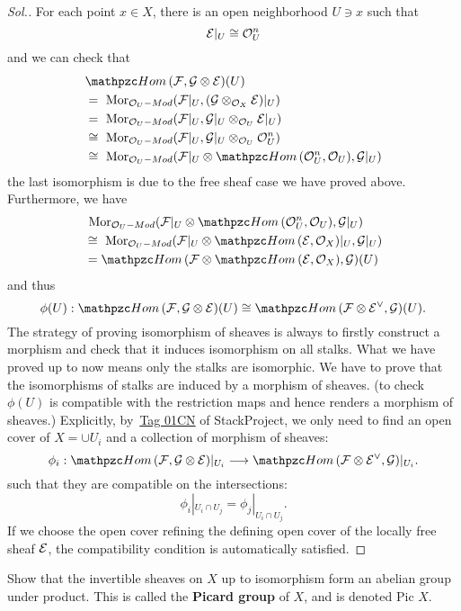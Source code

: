 \documentclass[11pt]{book} %
\begin{document}
\begin{proof}[Sol.]
For each point $x\in X$, there is an open neighborhood  $U\ni x$ such that 
$$
{\cal E}|_U\cong {\cal O}_U^n
$$
and we can check that
$$
\begin{aligned}
&\phom(\calf,\calg\otimes\cale)(U)\\
&=\mor_{\calo_U-Mod}(\calf|_U,(\calg\otimes_{\calo_X}\cale)|_U)\\
&=\mor_{\calo_U-Mod}(\calf|_U,\calg|_U\otimes_{\calo_U}\cale|_U)\\
&\cong \mor_{\calo_U-Mod}(\calf|_U,\calg|_U\otimes_{\calo_U}\calo_U^n)\\
&\cong \mor_{\calo_U-Mod}(\calf|_U\otimes\phom(\calo_U^n,\calo_U),\calg|_U)\\
\end{aligned}
$$
the last isomorphism is due to the free sheaf case we have proved above. 
Furthermore, we have
$$
\begin{aligned}
&\mor_{\calo_U-Mod}(\calf|_U\otimes\phom(\calo_U^n,\calo_U),\calg|_U)\\
&\cong \mor_{\calo_U-Mod}(\calf|_U\otimes\phom(\cale,\calo_X)|_U,\calg|_U)\\
&=\phom(\calf\otimes\phom(\cale,\calo_X),\calg)(U)
\end{aligned}
$$
and thus
$$
\phi(U):\phom(\calf,\calg\otimes\cale)(U)\cong\phom(\calf\otimes\cale^\vee,\calg)(U).
$$
The strategy of proving isomorphism of sheaves is always to firstly construct a morphism and check that it induces isomorphism on all stalks. What we have proved up to now means only the stalks are isomorphic. We have to prove that the isomorphisms of stalks are induced by a morphism of sheaves. (to check $\phi(U)$ is compatible with the restriction maps and hence renders a morphism of sheaves.) Explicitly, by~\href{http://stacks.math.columbia.edu/tag/01CN}{Tag 01CN} of StackProject, we only need to find an open cover of $X=\cup U_i$ and a collection of morphism of sheaves:
$$
\phi_i:\phom(\calf,\calg\otimes\cale)|_{U_i}\lrta \phom(\calf\otimes\cale^\vee,\calg)|_{U_i}.
$$
such that they are compatible on the intersections:
$$
\phi_i|_{U_i\cap U_j}=\phi_j|_{U_i\cap U_j}.
$$
If we choose the open cover refining the defining open cover of the locally free sheaf ${\cal E}$, the compatibility condition is automatically satisfied.
\end{proof}
\begin{exr}
Show that the invertible sheaves on $X$ up to isomorphism form an abelian group under product. This is called the \textbf{Picard group} of $X$, and is denoted $\text{Pic } X$. 
\end{exr}
\end{document}
